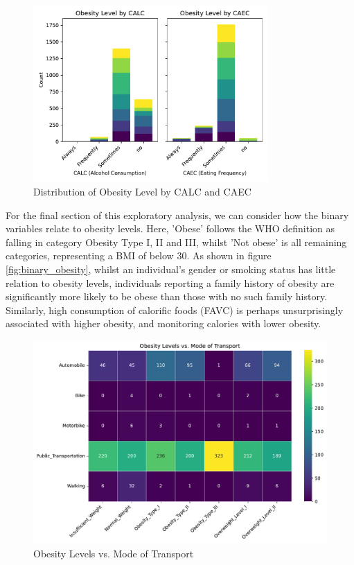 \begin{figure}
  \centering
  \includegraphics[width=0.8\textwidth]{CALC_and_CAEC.pdf}
  \caption{Distribution of Obesity Level by CALC and CAEC}
  \label{fig:calc_caec}
\end{figure}


For the final section of this exploratory analysis, we can consider how the binary variables relate to obesity levels. Here, 'Obese' follows the WHO definition as falling in category Obesity Type I, II and III, whilst 'Not obese' is all remaining categories, representing a BMI of below 30. As shown in figure \ref{fig:binary_obesity}, whilst an individual's gender or smoking status has little relation to obesity levels, individuals reporting a family history of obesity are significantly more likely to be obese than those with no such family history. Similarly, high consumption of calorific foods (FAVC) is perhaps unsurprisingly associated with higher obesity, and monitoring calories with lower obesity.   

\begin{figure}
  \centering
  \includegraphics[width=1\textwidth]{MTRANS_heatmap.pdf}
  \caption{Obesity Levels vs. Mode of Transport}
  \label{fig:MTRANS_heatmap}
\end{figure}

